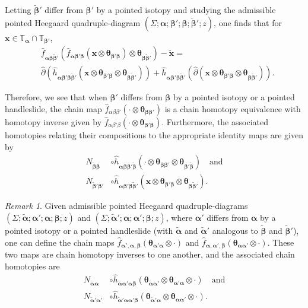 \documentclass[11pt]{article}
\theoremstyle{plain} \newtheorem{thm}{Theorem}[subsection]
\theoremstyle{plain} \newtheorem{cor}[thm]{Corollary}
\theoremstyle{plain} \newtheorem{prop}[thm]{Proposition}
\theoremstyle{plain} \newtheorem{conj}[thm]{Conjecture}
\theoremstyle{plain} \newtheorem{lem}[thm]{Lemma}
\theoremstyle{definition} \newtheorem{df}[thm]{Definition}
\theoremstyle{remark} \newtheorem{rmk}[thm]{Remark}
\theoremstyle{remark} \newtheorem{obs}[thm]{Observation}
\newcommand{\del}{\partial}
\newcommand{\tld}[1]{\widetilde{#1}}
\newcommand{\delh}{\widehat{\del}}
\newcommand{\ba}{\boldsymbol{\alpha}}
\newcommand{\bb}{\boldsymbol{\beta}}
\newcommand{\bat}{\boldsymbol{\tld{\alpha}}}
\newcommand{\bbt}{\boldsymbol{\tld{\beta}}}
\newcommand{\Ta}{\mathbb{T}_{\ba}}
\newcommand{\Tbp}{\tor{\bb'}}
\newcommand{\bx}{\mathbf{x}}
\newcommand{\thetabb}{\boldsymbol{\theta}_{\bb \bb'}}
\newcommand{\thet}[1]{\boldsymbol{\theta}_{#1}}
\newcommand{\thetabpb}{\boldsymbol{\theta}_{\bb' \bb}}
\newcommand{\tor}[1]{\mathbb{T}_{#1}}
\begin{document}
Letting $\bbt'$ differ from $\bb'$ by a pointed isotopy and studying the admissible pointed Heegaard quadruple-diagram $\left(\Sigma; \ba; \bb'; \bb; \bbt'; z\right)$, one finds that for $\bx \in \Ta \cap \Tbp$,
\begin{align*}
&\widehat{f}_{\ba\bb\bbt'} \left( \widehat{f}_{\ba\bb'\bb} \left( \bx \otimes \thet{\bb'\bb} \right) \otimes \thet{\bb\bbt'} \right)
- \tld{\bx} = \\
&\delh \left( \widehat{h}_{\ba\bb'\bb\bbt'} \left(\bx \otimes \thet{\bb'\bb} \otimes \thet{\bb\bbt'} \right) \right)
+ \widehat{h}_{\ba\bb'\bb\bbt'}  \left( \delh \left( \bx \otimes \thet{\bb'\bb} \otimes \thet{\bb\bbt'} \right) \right).
\end{align*}

Therefore, we see that when $\bb'$ differs from $\bb$ by a pointed isotopy or a pointed handleslide, the chain map $\widehat{f}_{\alpha\beta\beta'}(\cdot \otimes \thetabb)$ is a chain homotopy equivalence with homotopy inverse given by $\widehat{f}_{\alpha\beta'\beta}(\cdot \otimes \thetabpb)$.  Furthermore, the associated homotopies relating their compositions to the appropriate identity maps are given by
\begin{equation}\label{eqn:beta}
\begin{aligned}
N_{\tld{\bb}\bb} &\circ \widehat{h}_{\ba\bb\bb'\bbt} \left(\cdot \otimes \thet{\bb\bb'} \otimes \thet{\bb'\bbt} \right) \quad \text{and}\\
N_{\tld{\bb}'\bb'} &\circ \widehat{h}_{\ba\bb'\bb\bbt'} \left(\bx \otimes \thet{\bb'\bb} \otimes \thet{\bb\bbt'} \right).
\end{aligned}
\end{equation}

\begin{rmk}
Given admissible pointed Heegaard quadruple-diagrams $\left(\Sigma; \bat; \ba'; \ba; \bb; z\right)$ and $\left(\Sigma; \bat'; \ba; \ba'; \bb; z\right)$, where $\ba'$ differs from $\ba$ by a pointed isotopy or a pointed handleslide (with $\bat$ and $\bat'$ analogous to $\bbt$ and $\bbt'$), one can define the chain maps $\widehat{f}_{\ba', \ba,\bb}(\thet{\ba'\ba} \otimes \cdot)$ and $\widehat{f}_{\ba, \ba',\bb}(\thet{\ba\ba'} \otimes \cdot)$.  These two maps are chain homotopy inverses to one another, and the associated chain homotopies are
\begin{equation}\label{eqn:alpha}
\begin{aligned}
N_{\tld{\ba}\ba} &\circ  \widehat{h}_{\bat\ba'\ba\bb} \left( \thet{\bat\ba'} \otimes \thet{\ba'\ba} \otimes \cdot \right) \quad \text{and}\\
N_{\tld{\ba}' \ba'} &\circ  \widehat{h}_{\bat'\ba\ba'\bb} \left( \thet{\bat'\ba} \otimes \thet{\ba\ba'} \otimes \cdot \right).
\end{aligned}
\end{equation}
\end{rmk}
\end{document}

